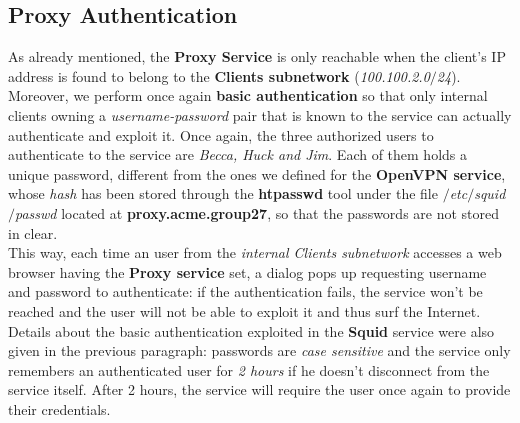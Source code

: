 \subsection{Proxy Authentication}
As already mentioned, the \textbf{Proxy Service} is only reachable when the client's IP address is found to belong to the \textbf{Clients subnetwork} (\textit{100.100.2.0$/$24}).\\
Moreover, we perform once again \textbf{basic authentication} so that only internal clients owning a \textit{username-password} pair that is known to the service can actually authenticate and exploit it. Once again, the three authorized users to authenticate to the service are \textit{Becca, Huck and Jim}. Each of them holds a unique password, different from the ones we defined for the \textbf{OpenVPN service}, whose \textit{hash} has been stored through the \textbf{htpasswd} tool under the file \textit{$/$etc$/$squid$/$passwd} located at \textbf{proxy.acme.group27}, so that the passwords are not stored in clear.\\
This way, each time an user from the \textit{internal Clients subnetwork} accesses a web browser having the \textbf{Proxy service} set, a dialog pops up requesting username and password to authenticate: if the authentication fails, the service won't be reached and the user will not be able to exploit it and thus surf the Internet.\\
Details about the basic authentication exploited in the \textbf{Squid} service were also given in the previous paragraph: passwords are \textit{case sensitive} and the service only remembers an authenticated user for \textit{2 hours} if he doesn't disconnect from the service itself. After 2 hours, the service will require the user once again to provide their credentials.
